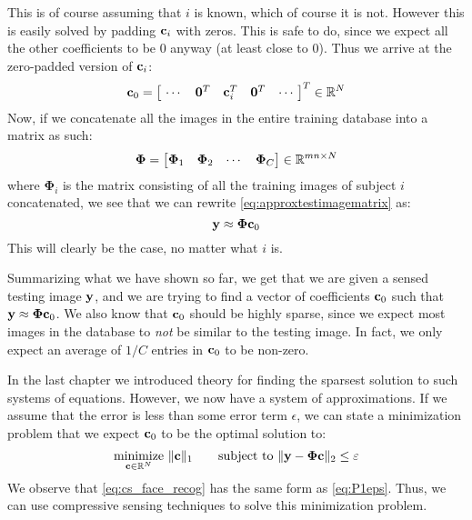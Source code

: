 This is of course assuming that $ i $ is known, which of course it is not. However this is easily solved by padding $ \mathbf{c}_i $ with zeros. This is safe to do, since we expect all the other coefficients to be $ 0 $ anyway (at least close to $ 0 $). Thus we arrive at the zero-padded version of $ \mathbf{c}_{i} $:
\begin{equation*}
	\label{eq:c0def}
	\mathbf{c}_{0} = \begin{bmatrix}~\cdots & \mathbf{0}^{T} & \mathbf{c}_{i}^{T} & \mathbf{0}^{T} & \cdots~\end{bmatrix}^{T} \in \mathbb{R}^{N}
\end{equation*}
Now, if we concatenate all the images in the entire training database into a matrix as such:
\[
	\mathbf{\Phi} = \begin{bmatrix}\mathbf{\Phi}_{1} & \mathbf{\Phi}_{2} & \cdots & \mathbf{\Phi}_{C}\end{bmatrix} \in \mathbb{R}^{mn \times N}
\]
where $ \mathbf{\Phi}_{i} $ is the matrix consisting of all the training images of subject $ i $ concat\-enated, we see that we can rewrite \eqref{eq:approxtestimagematrix} as:
\begin{equation}
	\label{eq:approxtestimagefinal}
	\mathbf{y} \approx \mathbf{\Phi}\mathbf{c}_{0}
\end{equation}
This will clearly be the case, no matter what $ i $ is. 

Summarizing what we have shown so far, we get that we are given a sensed testing image $ \mathbf{y} $, and we are trying to find a vector of coefficients $ \mathbf{c}_{0} $ such that $ \mathbf{y} \approx \mathbf{\Phi}\mathbf{c}_{0} $. We also know that $ \mathbf{c}_{0} $ should be highly sparse, since we expect most images in the database to \textit{not} be similar to the testing image. In fact, we only expect an average of $ 1/C $ entries in $ \mathbf{c}_{0} $ to be non-zero. 

In the last chapter we introduced theory for finding the sparsest solution to such systems of equations. However, we now have a system of approximations. If we assume that the error is less than some error term $ \epsilon $, we can state a minimization problem that we expect $ \mathbf{c}_{0} $ to be the optimal solution to:
\begin{equation}
	\label{eq:cs_face_recog}
	\underset{\mathbf{c} \in \mathbb{R}^{N}}{\text{minimize}}~ \lVert\mathbf{c}\rVert_{1} \quad\quad\text{subject to}~ \lVert\mathbf{y} - \mathbf{\Phi}\mathbf{c}\rVert_{2} \leq \varepsilon
\end{equation}
We observe that \eqref{eq:cs_face_recog} has the same form as \eqref{eq:P1eps}. Thus, we can use compressive sensing techniques to solve this minimization problem. 

